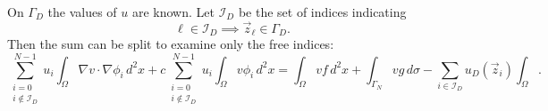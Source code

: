 \documentclass{article}
\begin{document}
\newpage 

On $\Gamma_D$ the values of $u$ are known.  
Let $\mathcal I_D$ be the set of indices 
indicating 
\[
  \ell \in \mathcal I_D \implies \vec z_\ell \in \Gamma_D
.\] 
Then the sum can be split to examine only the free indices:
\[
		\sum_{\substack{i = 0 \\ i \not\in \mathcal I_D}}^{N-1}
		u_i \int_\Omega \nabla v \cdot \nabla \phi_i \, d^2 x + 
		c \sum_{\substack{i = 0 \\ i \not\in \mathcal I_D}}^{N-1}
		u_i \int_\Omega v \phi_i \, d^2 x = 
		\int_\Omega v f \, d^2 x + \int_{\Gamma_N} v g \, d\sigma 
		- \sum_{i \in \mathcal I_D} 
		u_D(\vec z_i) \int_\Omega 
.\] 
\end{document}
